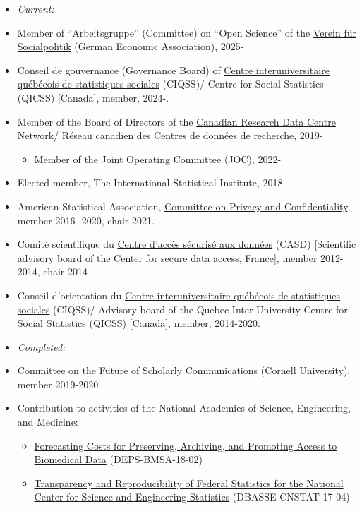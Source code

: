 \documentclass[10pt,letterpaper]{report}
\begin{document}
\begin{itemize}
\item[] \textit{Current:}

\item Member of ``Arbeitsgruppe'' (Committee) on ``Open Science'' of the \href{https://www.socialpolitik.de/}{Verein für Socialpolitik} (German Economic Association), 2025-
\item Conseil de gouvernance (Governance Board) of \href{https://ciqss.org}{Centre interuniversitaire 	qu\'eb\'ecois de statistiques sociales} (CIQSS)/ 
Centre for Social Statistics (QICSS) [Canada], member, 2024-.
\item Member of the Board of Directors of the \href{https://crdcn.org/}{Canadian Research Data Centre Network}/ R\'eseau canadien des Centres de donn\'ees de recherche, 2019- 
\begin{itemize}
\item Member of the Joint Operating Committee (JOC), 2022-
\end{itemize}
\item Elected member, The International Statistical Institute, 2018-
\item American Statistical Association, \href{http://community.amstat.org/cpc/home}{Committee on Privacy and Confidentiality}, member 2016- 2020, chair 2021.
\item Comit\'e scientifique du \href{https://casd.eu/}{Centre d'acc\`es s\'ecuris\'e aux 
donn\'ees} (CASD) [Scientific advisory board of the Center for secure data 
access, France], member 2012-2014, chair 2014-  
\item Conseil d'orientation du \href{https://ciqss.org}{Centre interuniversitaire 	qu\'eb\'ecois de statistiques sociales} (CIQSS)/ Advisory board of the Quebec Inter-University 
Centre for Social Statistics (QICSS) [Canada], member, 2014-2020.
\item[] \textit{Completed:}
\item Committee on the Future of Scholarly Communications (Cornell University), member 2019-2020 
\item Contribution to activities of the National Academies of Science, Engineering, and Medicine:
\begin{itemize}
	\item \href{https://www8.nationalacademies.org/pa/projectview.aspx?key=51436}{Forecasting Costs for Preserving, Archiving, and Promoting Access to Biomedical Data} (DEPS-BMSA-18-02)
	\item \href{https://www8.nationalacademies.org/pa/projectview.aspx?key=51187}{Transparency and Reproducibility of Federal Statistics for the National Center for Science and Engineering Statistics} (DBASSE-CNSTAT-17-04)

\end{itemize}
\end{itemize}
\end{document}
